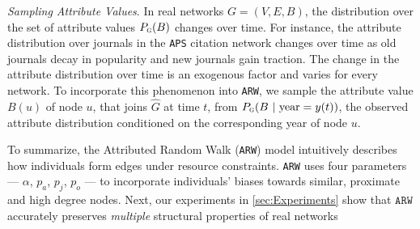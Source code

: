 \textit{Sampling Attribute Values}. In real networks $G=(V,E,B)$,
the distribution over the set of attribute values $P_{\textsc{g}}(B)$ changes over time.
For instance, the attribute distribution over journals in the \texttt{APS} citation
network changes over time as old journals decay in popularity and new journals gain traction.
The change in the attribute distribution over time is an exogenous factor and varies for every network.
To incorporate this phenomenon into \texttt{ARW}, we sample the attribute value $B(u)$ of node $u$, that
joins $\hat{G}$ at time $t$, from $P_{\textsc{g}}(B{\mbox{ | year}=y(t)})$, the observed attribute distribution
conditioned on the corresponding year of node $u$.


To summarize, the Attributed Random Walk (\texttt{ARW}) model
intuitively describes how individuals form edges under resource constraints.
\texttt{ARW} uses four parameters --- $\alpha$, $p_a$, $p_j$, $p_o$ --- to incorporate
individuals' biases towards similar, proximate and high degree nodes.
Next, our experiments in
\cref{sec:Experiments} show that $\texttt{ARW}$ accurately preserves
\textit{multiple} structural properties of real networks
